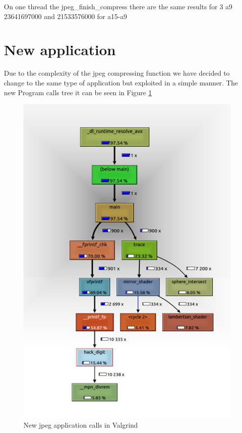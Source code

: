 \documentclass[journal]{IEEEtran}
\begin{document}
On one thread the jpeg\_finish\_compress there are the same results for 3 a9 23641697000 and 21533576000 for a15-a9




\section{New application}
Due to the complexity of the jpeg compressing function we have decided to change to the same type of application but exploited in a simple manner. The new Program calls tree it can be seen in Figure \ref{fig:valgrind2}

\begin{figure}[!h]
	\centering
	\includegraphics[width=.8\linewidth]{valgrind2}
	\caption{New jpeg application calls in Valgrind}
	\label{fig:valgrind2}
\end{figure}
\end{document}
